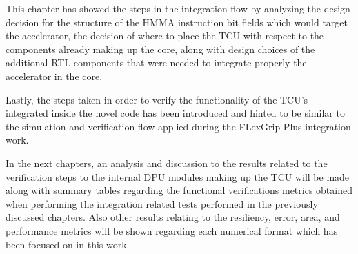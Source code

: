 This chapter has showed the steps in the integration flow by analyzing the design decision for the structure of the HMMA instruction bit fields which would target the accelerator, the decision of where to place the TCU with respect to the components already making up the core, along with design choices of the additional RTL-components that were needed to integrate properly the accelerator in the core.

Lastly, the steps taken in order to verify the functionality of the TCU's integrated inside the novel code has been introduced and hinted to be similar to the simulation and verification flow applied during the FLexGrip Plus integration work. 

In the next chapters, an analysis and discussion to the results related to the verification steps to the internal DPU modules making up the TCU will be made along with summary tables regarding the functional verifications metrics obtained when performing the integration related tests performed in the previously discussed chapters. Also other results relating to the resiliency, error, area, and performance metrics will be shown regarding each numerical format which has been focused on in this work.
